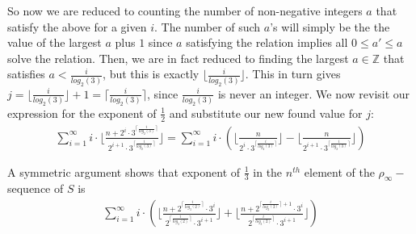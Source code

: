 So now we are reduced to counting the number of non-negative integers $a$ that satisfy the above for a given $i$.  The number of such $a$'s will simply be the the value of the largest $a$ plus $1$ since $a$ satisfying the relation implies all $0 \leq a' \leq a$ solve the relation. Then, we are in fact reduced to finding the largest $a \in \mathbb{Z}$ that satisfies $a < \frac{i}{log_2(3)}$, but this is exactly $\lfloor \frac{i}{log_2(3)}\rfloor$. This in turn gives $j =  \lfloor \frac{i}{log_2(3)}\rfloor + 1= \lceil \frac{i}{log_2(3)}\rceil$, since $\frac{i}{log_2(3)}$ is never an integer. We now revisit our expression for the exponent of $\frac{1}{2}$ and substitute our new found value for $j$:\\

\begin{align} 
\sum_{i=1}^\infty i \cdot \lfloor\frac{n + 2^i \cdot 3^{\lceil \frac{i}{log_2(3)}\rceil}}{2^{i+1}\cdot 3^{\lceil \frac{i}{log_2(3)}\rceil}} \rfloor
=\sum_{i=1}^\infty i \cdot (\lfloor\frac{n}{2^i \cdot 3^{\lceil \frac{i}{log_2(3)}\rceil }}\rfloor -  \lfloor\frac{n}{2^{i+1}\cdot 3^{\lceil \frac{i}{log_2(3)}\rceil}} \rfloor)
\end{align}



A symmetric argument shows that exponent of $\frac{1}{3}$ in the $n^{th}$ element of the $\rho_\infty-$sequence of $S$ is\\ 

\begin{align} 
\sum_{i=1}^\infty i \cdot (\lfloor\frac{n + 2^{\lceil \frac{i}{log_3(2)}\rceil} \cdot 3^i}{2^{\lceil \frac{i}{log_3(2)}\rceil}\cdot 3^{i+1}} \rfloor + \lfloor\frac{n + 2^{\lceil \frac{i}{log_3(2)}\rceil+1} \cdot 3^i}{2^{\lceil \frac{i}{log_3(2)}\rceil}\cdot 3^{i+1}} \rfloor)
\end{align}

